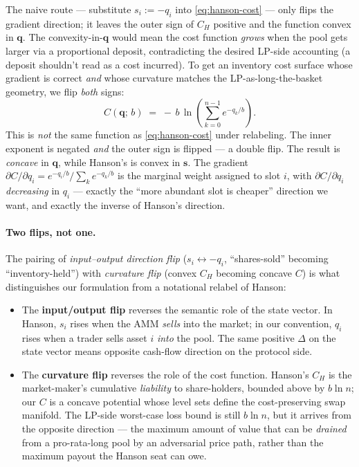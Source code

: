 \documentclass[11pt]{article}
\begin{document}
The naive route --- substitute $s_i := -q_i$ into
\eqref{eq:hanson-cost} --- only flips the gradient direction; it leaves
the outer sign of $C_H$ positive and the function convex in
$\mathbf{q}$. The convexity-in-$\mathbf{q}$ would mean the cost
function \emph{grows} when the pool gets larger via a proportional
deposit, contradicting the desired LP-side accounting (a deposit
shouldn't read as a cost incurred). To get an inventory cost surface
whose gradient is correct \emph{and} whose curvature matches the
LP-as-long-the-basket geometry, we flip \emph{both} signs:
\begin{equation}
  \label{eq:inventory-cost}
  C(\mathbf{q};\,b)
  \;=\;
  -\,b\,\ln\!\left(\sum_{k=0}^{n-1} e^{-q_k/b}\right).
\end{equation}
This is \emph{not} the same function as \eqref{eq:hanson-cost} under
relabeling. The inner exponent is negated \emph{and} the outer sign is
flipped --- a double flip. The result is \emph{concave} in
$\mathbf{q}$, while Hanson's is convex in $\mathbf{s}$. The gradient
$\partial C / \partial q_i = e^{-q_i/b} / \sum_k e^{-q_k/b}$ is the
marginal weight assigned to slot $i$, with $\partial C / \partial q_i$
\emph{decreasing} in $q_i$ --- exactly the ``more abundant slot is
cheaper'' direction we want, and exactly the inverse of Hanson's
direction.

\paragraph{Two flips, not one.}
The pairing of \emph{input--output direction flip}
($s_i \leftrightarrow -q_i$, ``shares-sold'' becoming
``inventory-held'') with \emph{curvature flip} (convex $C_H$ becoming
concave $C$) is what distinguishes our formulation from a notational
relabel of Hanson:
\begin{itemize}
  \item The \textbf{input/output flip} reverses the semantic role of
        the state vector. In Hanson, $s_i$ rises when the AMM
        \emph{sells} into the market; in our convention, $q_i$ rises
        when a trader sells asset $i$ \emph{into} the pool. The same
        positive $\Delta$ on the state vector means opposite
        cash-flow direction on the protocol side.
  \item The \textbf{curvature flip} reverses the role of the cost
        function. Hanson's $C_H$ is the market-maker's cumulative
        \emph{liability} to share-holders, bounded above by
        $b\ln n$; our $C$ is a concave potential whose level sets
        define the cost-preserving swap manifold. The LP-side
        worst-case loss bound is still $b\ln n$, but it arrives from
        the opposite direction --- the maximum amount of value that
        can be \emph{drained} from a pro-rata-long pool by an
        adversarial price path, rather than the maximum payout the
        Hanson seat can owe.
\end{itemize}
\end{document}
